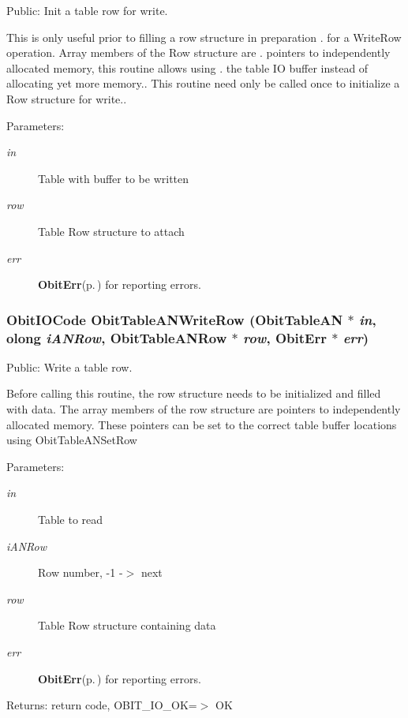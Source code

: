 Public: Init a table row for write. 

This is only useful prior to filling a row structure in preparation . for a Write\-Row operation. Array members of the Row structure are . pointers to independently allocated memory, this routine allows using . the table IO buffer instead of allocating yet more memory.. This routine need only be called once to initialize a Row structure for write.. \begin{Desc}
\item[Parameters:]
\begin{description}
\item[{\em in}]Table with buffer to be written \item[{\em row}]Table Row structure to attach \item[{\em err}]{\bf Obit\-Err}{\rm (p.\,\pageref{structObitErr})} for reporting errors. \end{description}
\end{Desc}
\subsubsection{\setlength{\rightskip}{0pt plus 5cm}Obit\-IOCode Obit\-Table\-ANWrite\-Row ({\bf Obit\-Table\-AN} $\ast$ {\em in}, {\bf olong} {\em i\-ANRow}, {\bf Obit\-Table\-ANRow} $\ast$ {\em row}, {\bf Obit\-Err} $\ast$ {\em err})}\label{ObitTableAN_8h_a20}


Public: Write a table row. 

Before calling this routine, the row structure needs to be initialized and filled with data. The array members of the row structure are pointers to independently allocated memory. These pointers can be set to the correct table buffer locations using Obit\-Table\-ANSet\-Row \begin{Desc}
\item[Parameters:]
\begin{description}
\item[{\em in}]Table to read \item[{\em i\-ANRow}]Row number, -1 -$>$ next \item[{\em row}]Table Row structure containing data \item[{\em err}]{\bf Obit\-Err}{\rm (p.\,\pageref{structObitErr})} for reporting errors. \end{description}
\end{Desc}
\begin{Desc}
\item[Returns:]return code, OBIT\_\-IO\_\-OK=$>$ OK \end{Desc}
